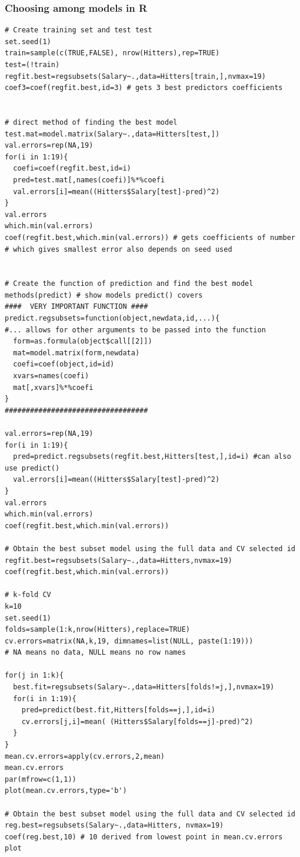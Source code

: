 \documentclass[11pt]{article}
\begin{document}
\subsubsection{Choosing among models in R}
\begin{lstlisting}
# Create training set and test test
set.seed(1)
train=sample(c(TRUE,FALSE), nrow(Hitters),rep=TRUE)
test=(!train)
regfit.best=regsubsets(Salary~.,data=Hitters[train,],nvmax=19)
coef3=coef(regfit.best,id=3) # gets 3 best predictors coefficients


# direct method of finding the best model
test.mat=model.matrix(Salary~.,data=Hitters[test,])
val.errors=rep(NA,19)
for(i in 1:19){
  coefi=coef(regfit.best,id=i)
  pred=test.mat[,names(coefi)]%*%coefi
  val.errors[i]=mean((Hitters$Salary[test]-pred)^2)
}
val.errors
which.min(val.errors)
coef(regfit.best,which.min(val.errors)) # gets coefficients of number
# which gives smallest error also depends on seed used


# Create the function of prediction and find the best model
methods(predict) # show models predict() covers 
####  VERY IMPORTANT FUNCTION ####
predict.regsubsets=function(object,newdata,id,...){ 
#... allows for other arguments to be passed into the function
  form=as.formula(object$call[[2]])
  mat=model.matrix(form,newdata)
  coefi=coef(object,id=id)
  xvars=names(coefi)
  mat[,xvars]%*%coefi
}
##################################

val.errors=rep(NA,19)
for(i in 1:19){
  pred=predict.regsubsets(regfit.best,Hitters[test,],id=i) #can also use predict()
  val.errors[i]=mean((Hitters$Salary[test]-pred)^2)
}
val.errors
which.min(val.errors)
coef(regfit.best,which.min(val.errors))

# Obtain the best subset model using the full data and CV selected id
regfit.best=regsubsets(Salary~.,data=Hitters,nvmax=19)
coef(regfit.best,which.min(val.errors))

# k-fold CV
k=10
set.seed(1)
folds=sample(1:k,nrow(Hitters),replace=TRUE)
cv.errors=matrix(NA,k,19, dimnames=list(NULL, paste(1:19)))
# NA means no data, NULL means no row names

for(j in 1:k){
  best.fit=regsubsets(Salary~.,data=Hitters[folds!=j,],nvmax=19)
  for(i in 1:19){
    pred=predict(best.fit,Hitters[folds==j,],id=i)
    cv.errors[j,i]=mean( (Hitters$Salary[folds==j]-pred)^2)
  }
}
mean.cv.errors=apply(cv.errors,2,mean)
mean.cv.errors
par(mfrow=c(1,1))
plot(mean.cv.errors,type='b')

# Obtain the best subset model using the full data and CV selected id
reg.best=regsubsets(Salary~.,data=Hitters, nvmax=19)
coef(reg.best,10) # 10 derived from lowest point in mean.cv.errors plot
\end{lstlisting}
\end{document}

